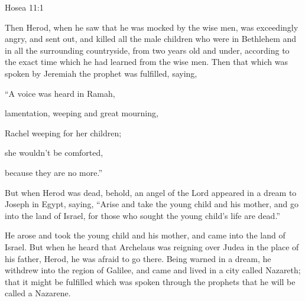 {{Hosea 11:1}
\par }{\PP {}Then Herod, when he saw that he was mocked by the wise men, was exceedingly angry, and sent out, and killed all the male children who were in Bethlehem and in all the surrounding countryside, from two years old and under, according to the exact time which he had learned from the wise men.
Then that which was spoken by Jeremiah the prophet was fulfilled, saying,
\par }{\Q {}“A voice was heard in Ramah,
\par }{\QB lamentation, weeping and great mourning,
\par }{\Q Rachel weeping for her children;
\par }{\QB she wouldn’t be comforted,
\par }{\QB because they are no more.”
\par }{\PP {}But when Herod was dead, behold, an angel of the Lord appeared in a dream to Joseph in Egypt, saying,
“Arise and take the young child and his mother, and go into the land of Israel, for those who sought the young child’s life are dead.”
\par }{\PP {}He arose and took the young child and his mother, and came into the land of Israel.
But when he heard that Archelaus was reigning over Judea in the place of his father, Herod, he was afraid to go there. Being warned in a dream, he withdrew into the region of Galilee,
and came and lived in a city called Nazareth; that it might be fulfilled which was spoken through the prophets that he will be called a Nazarene.

}
